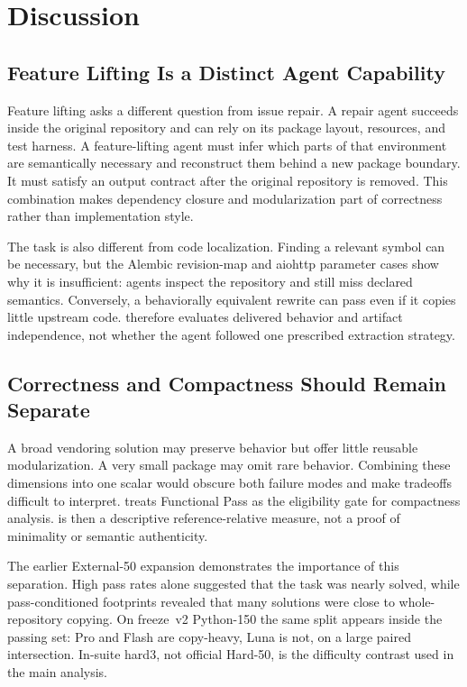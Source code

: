 \section{Discussion}
\label{sec:discussion}

\subsection{Feature Lifting Is a Distinct Agent Capability}

Feature lifting asks a different question from issue repair. A repair agent
succeeds inside the original repository and can rely on its package layout,
resources, and test harness. A feature-lifting agent must infer which parts of
that environment are semantically necessary and reconstruct them behind a new
package boundary. It must satisfy an output contract after the original
repository is removed. This combination makes dependency closure and
modularization part of correctness rather than implementation style.

The task is also different from code localization. Finding a relevant symbol
can be necessary, but the Alembic revision-map and aiohttp parameter cases
show why it is insufficient: agents inspect the repository and still miss
declared semantics. Conversely, a behaviorally equivalent rewrite can pass
even if it copies little upstream code. \flb therefore evaluates delivered
behavior and artifact independence, not whether the agent followed one
prescribed extraction strategy.

\subsection{Correctness and Compactness Should Remain Separate}

A broad vendoring solution may preserve behavior but offer little reusable
modularization. A very small package may omit rare behavior. Combining these
dimensions into one scalar would obscure both failure modes and make tradeoffs
difficult to interpret. \flb treats Functional Pass as the eligibility gate
for compactness analysis. \rres is then a descriptive reference-relative
measure, not a proof of minimality or semantic authenticity.

The earlier External-50 expansion demonstrates the importance of this
separation. High pass rates alone suggested that the task was nearly solved,
while pass-conditioned footprints revealed that many solutions were close to
whole-repository copying. On freeze~v2 Python-150 the same split appears
inside the passing set: Pro and Flash are copy-heavy, Luna is not, on a
large paired intersection. In-suite hard3, not official Hard-50, is the
difficulty contrast used in the main analysis.

